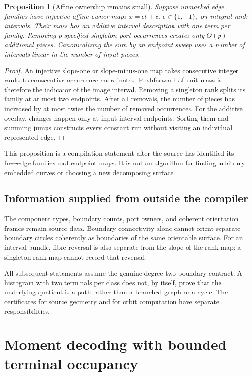 \documentclass[11pt]{article}
\newtheorem{proposition}[theorem]{Proposition}
\theoremstyle{definition}\newtheorem{definition}[theorem]{Definition}\newtheorem{example}[theorem]{Example}
\theoremstyle{remark}\newtheorem{remark}[theorem]{Remark}
\begin{document}
\begin{proposition}[Affine ownership remains small]
\label{prop:ownership}
Suppose unmarked edge families have injective affine owner maps $x=\epsilon t+c$, $\epsilon\in\{1,-1\}$, on integral rank intervals. Their mass has an additive interval description with one term per family. Removing $p$ specified singleton port occurrences creates only $O(p)$ additional pieces. Canonicalizing the sum by an endpoint sweep uses a number of intervals linear in the number of input pieces.
\end{proposition}
\begin{proof}
An injective slope-one or slope-minus-one map takes consecutive integer ranks to consecutive occurrence coordinates. Pushforward of unit mass is therefore the indicator of the image interval. Removing a singleton rank splits its family at at most two endpoints. After all removals, the number of pieces has increased by at most twice the number of removed occurrences. For the additive overlay, changes happen only at input interval endpoints. Sorting them and summing jumps constructs every constant run without visiting an individual represented edge.
\end{proof}

This proposition is a compilation statement after the source has identified its free-edge families and endpoint maps. It is not an algorithm for finding arbitrary embedded curves or choosing a new decomposing surface.

\subsection{Information supplied from outside the compiler}
The component types, boundary counts, port owners, and coherent orientation frames remain source data. Boundary connectivity alone cannot orient separate boundary circles coherently as boundaries of the same orientable surface. For an interval bundle, fibre reversal is also separate from the slope of the rank map: a singleton rank map cannot record that reversal.

All subsequent statements assume the genuine degree-two boundary contract. A histogram with two terminals per class does not, by itself, prove that the underlying quotient is a path rather than a branched graph or a cycle. The certificates for source geometry and for orbit computation have separate responsibilities.

\section{Moment decoding with bounded terminal occupancy}
\label{sec:moments}
\end{document}

